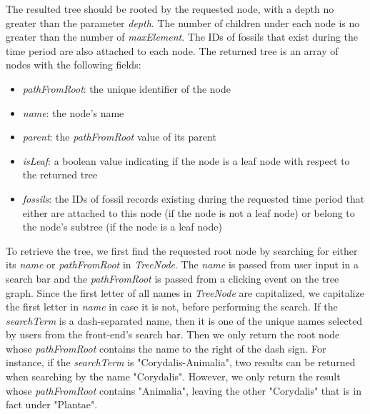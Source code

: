 \documentclass[11pt, a4paper,oneside,chapterprefix=false]{scrbook}
\begin{document}
The resulted tree should be rooted by the requested node, with a depth no greater than the parameter \emph{depth}. The number of children under each node is no greater than the number of \emph{maxElement}. The IDs of fossils that exist during the time period are also attached to each node. The returned tree is an array of nodes with the following fields:  

\begin{itemize}
	\item \textit{pathFromRoot}: the unique identifier of the node
	\item \textit{name}: the node's name
	\item \textit{parent}: the \textit{pathFromRoot} value of its parent
	\item \textit{isLeaf}: a boolean value indicating if the node is a leaf node with respect to the returned tree
	\item \textit{fossils}: the IDs of fossil records existing during the requested time period that either are attached to this node (if the node is not a leaf node) or belong to the node's subtree (if the node is a leaf node)
\end{itemize}

To retrieve the tree, we first find the requested root node by searching for either its \emph{name} or \emph{pathFromRoot} in \emph{TreeNode}. The \emph{name} is passed from user input in a search bar and the \emph{pathFromRoot} is passed from a clicking event on the tree graph. Since the first letter of all names in \emph{TreeNode} are capitalized, we capitalize the first letter in \emph{name} in case it is not, before performing the search. If the \emph{searchTerm} is a dash-separated name, then it is one of the unique names selected by users from the front-end's search bar. Then we only return the root node whose \emph{pathFromRoot} contains the name to the right of the dash sign. For instance, if the \emph{searchTerm} is "Corydalis-Animalia", two results can be returned when searching by the name "Corydalis". However, we only return the result whose \emph{pathFromRoot} contains "Animalia", leaving the other "Corydalis" that is in fact under "Plantae".\\
\end{document}

